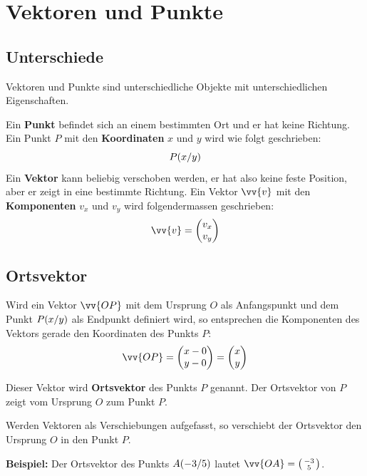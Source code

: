 \newpage
\section{Vektoren und Punkte}

\subsection{Unterschiede}
Vektoren und Punkte sind unterschiedliche Objekte mit unterschiedlichen Eigenschaften.

Ein \textbf{Punkt} befindet sich an einem bestimmten Ort und er hat keine Richtung. Ein Punkt $P$ mit den \textbf{Koordinaten} $x$ und $y$ wird wie folgt geschrieben:
\[
  \coord[P]{x,y}
\]
Ein \textbf{Vektor} kann beliebig verschoben werden, er hat also keine feste Position, aber er zeigt in eine bestimmte Richtung. Ein Vektor $\vv{v}$ mit den \textbf{Komponenten} $v_{x}$ und $v_{y}$ wird folgendermassen geschrieben:
\[
  \vv{v} = \dvec{v_{x},v_{y}}
\]

\subsection{Ortsvektor}

Wird ein Vektor $\vv{OP}$ mit dem Ursprung $O$ als Anfangspunkt und dem Punkt $\coord[P]{x,y}$ als Endpunkt definiert wird, so entsprechen die Komponenten des Vektors gerade den Koordinaten des Punkts $P$:
\[
  \vv{OP} = \dvec{x-0,y-0} = \dvec{x,y}
\]
\begin{center}
\end{center}

Dieser Vektor wird \textbf{Ortsvektor} des Punkts $P$ genannt. Der Ortsvektor von $P$ zeigt vom Ursprung $O$ zum Punkt $P$.

Werden Vektoren als Verschiebungen aufgefasst, so verschiebt der Ortsvektor den Ursprung $O$ in den Punkt $P$.
\begin{example}
  \textbf{Beispiel:} Der Ortsvektor des Punkts $\coord[A]{-3,5}$ lautet $\vv{OA} = \tvec{-3,5}$.
\end{example}

